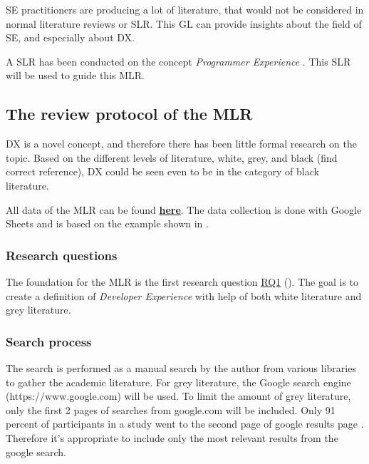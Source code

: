 \documentclass[english, 12pt, a4paper, sci, utf8, a-1b, online]{aaltothesis}
\begin{document}
SE practitioners are producing a lot of literature, that would not be considered in normal literature reviews or SLR. This GL can provide insights about the field of SE, and especially about DX.

A SLR has been conducted on the concept \textit{Programmer Experience} \citep{programmer-experience}. This SLR will be used to guide this MLR.


\subsection{The review protocol of the MLR}

DX is a novel concept, and therefore there has been little formal research on the topic. Based on the different levels of literature, white, grey, and black \citep{guidelines-for-MLR} (find correct reference), DX could be seen even to be in the category of black literature.

\newcommand{\mlrdxlink}{https://docs.google.com/spreadsheets/d/1BLX4eQypAvxd3Gzft0s0rqUHdMYaKxPAbpZZ4dAvJqU/edit?usp=sharing}

All data of the MLR can be found \href{\mlrdxlink}{\textbf{here}}. The data collection is done with Google Sheets and is based on the example shown in \citep{guidelines-for-MLR}.

\subsubsection{Research questions}

The foundation for the MLR is the first research question \hyperref[RQ1]{RQ1} (\rqone). The goal is to create a definition of \textit{Developer Experience} with help of both white literature and grey literature.

\subsubsection{Search process}

The search is performed as a manual search by the author from various libraries to gather the academic literature. For grey literature, the Google search engine (https://www.google.com) will be used. To limit the amount of grey literature, only the first 2 pages of searches from google.com will be included. Only 91 percent of participants in a study went to the second page of google results page \citep{google-search}. Therefore it's appropriate to include only the most relevant results from the google search.
\end{document}
